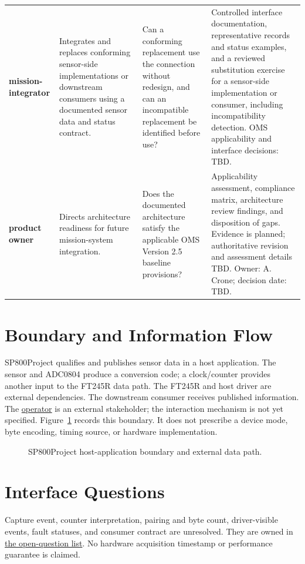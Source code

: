 \begin{tabularx}{\linewidth}{L{2.8cm}YYY}
\label{Stakeholder:MissionIntegrator}\textbf{mission-integrator}\par{} &
Integrates and replaces conforming sensor-side implementations or downstream
consumers using a documented sensor data and status contract. &
Can a conforming replacement use the connection without redesign, and can an
incompatible replacement be identified before use? &
Controlled interface documentation, representative records and status
examples, and a reviewed substitution exercise for a sensor-side
implementation or consumer, including incompatibility detection.
OMS applicability and interface decisions: TBD.\\
\label{Stakeholder:ProductOwner}\textbf{product owner}\par{} &
Directs architecture readiness for future mission-system integration. &
Does the documented architecture satisfy the applicable OMS Version 2.5 baseline provisions? &
Applicability assessment, compliance matrix, architecture review findings,
and disposition of gaps. Evidence is planned; authoritative revision and
assessment details TBD. Owner: A. Crone; decision date: TBD.\\
\end{tabularx}
\endgroup

\section{Boundary and Information Flow}
SP800Project qualifies and publishes sensor data in a host application. The sensor
and ADC0804 produce a conversion code; a clock/counter provides another input
to the FT245R data path. The FT245R and host driver are external dependencies.
The downstream consumer receives published information. The \hyperref[Stakeholder:Operator]{operator} is an
external stakeholder; the interaction mechanism is not yet specified.
Figure~\ref{Figure:SP800Context} records this boundary. It does not prescribe
a device mode, byte encoding, timing source, or hardware implementation.
\begin{figure}[htbp]
\centering

\caption{SP800Project host-application boundary and external data path.}
\label{Figure:SP800Context}
\end{figure}
\section{Interface Questions}
Capture event, counter interpretation, pairing and byte count, driver-visible
events, fault statuses, and consumer contract are unresolved. They are owned
in \hyperref[Section:SP800OpenQuestions]{the open-question list}.
No hardware acquisition timestamp or performance guarantee is claimed.
